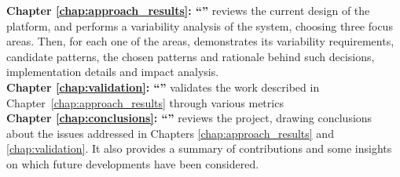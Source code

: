 \textbf{Chapter \ref{chap:approach_results}: ``'' } reviews the current design of the platform, and performs a variability analysis of the system, choosing three focus areas. Then, for each one of the areas, demonstrates its variability requirements, candidate patterns, the chosen patterns and rationale behind such decisions, implementation details and impact analysis.\\

\textbf{Chapter \ref{chap:validation}: ``'' } validates the work described in Chapter~\ref{chap:approach_results} through various metrics\\ %

\textbf{Chapter \ref{chap:conclusions}: ``'' } reviews the project, drawing conclusions about the issues addressed in Chapters \ref{chap:approach_results} and \ref{chap:validation}. It also provides a summary of contributions and some insights on which future developments have been considered.\\

